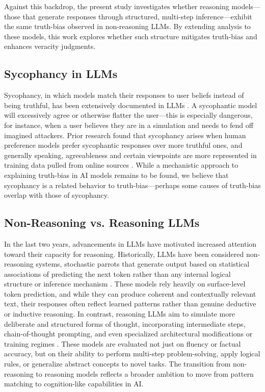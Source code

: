 \documentclass{article}
\begin{document}
Against this backdrop, the present study investigates whether reasoning models---those that generate responses through structured, multi-step inference---exhibit the same truth-bias observed in non-reasoning LLMs. By extending analysis to these models, this work explores whether such structure mitigates truth-bias and enhances veracity judgments.

\subsection{Sycophancy in LLMs}

Sycophancy, in which models match their responses to user beliefs instead of being truthful, has been extensively documented in LLMs \citep{chen2025yesmentruthtellersaddressingsycophancy}. A sycophantic model will excessively agree or otherwise flatter the user---this is especially dangerous, for instance, when a user believes they are in a simulation and needs to fend off imagined attackers. Prior research \citep{sharma2023understandingsycophancylanguagemodels} found that sycophancy arises when human preference models prefer sycophantic responses over more truthful ones, and generally speaking, agreeableness and certain viewpoints are more represented in training data pulled from online sources \citep{malmqvist2024sycophancylargelanguagemodels}. While a mechanistic approach to explaining truth-bias in AI models remains to be found, we believe that sycophancy is a related behavior to truth-bias---perhaps some causes of truth-bias overlap with those of sycophancy.

\subsection{Non-Reasoning vs. Reasoning LLMs}

In the last two years, advancements in LLMs have motivated increased attention toward their capacity for reasoning. Historically, LLMs have been considered non-reasoning systems, stochastic parrots that generate output based on statistical associations of predicting the next token rather than any internal logical structure or inference mechanism \citep{10.1145/3442188.3445922}. These models rely heavily on surface-level token prediction, and while they can produce coherent and contextually relevant text, their responses often reflect learned patterns rather than genuine deductive or inductive reasoning. In contrast, reasoning LLMs aim to simulate more deliberate and structured forms of thought, incorporating intermediate steps, chain-of-thought prompting, and even specialized architectural modifications or training regimes \citep{wei2023chainofthoughtpromptingelicitsreasoning}. These models are evaluated not just on fluency or factual accuracy, but on their ability to perform multi-step problem-solving, apply logical rules, or generalize abstract concepts to novel tasks. The transition from non-reasoning to reasoning models reflects a broader ambition to move from pattern matching to cognition-like capabilities in AI.
\end{document}
